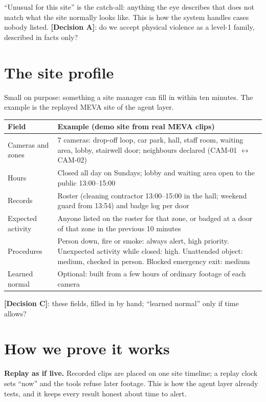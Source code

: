\documentclass[11pt,a4paper]{article}
\newcommand{\decision}[1]{\textbf{\color{accent}[Decision #1]}}
\begin{document}
``Unusual for this site'' is the catch-all: anything the eye describes that does not match what the site normally
looks like. This is how the system handles cases nobody listed.
\decision{A}: do we accept physical violence as a level-1 family, described in facts only?

\section{The site profile}
Small on purpose: something a site manager can fill in within ten minutes. The example is the replayed MEVA site
of the agent layer.

\begin{center}
\small
\begin{tabularx}{\textwidth}{L{3.3cm}Y}
\toprule
\textbf{Field} & \textbf{Example (demo site from real MEVA clips)}\\
\midrule
Cameras and zones & 7 cameras: drop-off loop, car park, hall, staff room, waiting area, lobby, stairwell door; neighbours declared (CAM-01 $\leftrightarrow$ CAM-02)\\
Hours & Closed all day on Sundays; lobby and waiting area open to the public 13:00--15:00\\
Records & Roster (cleaning contractor 13:00--15:00 in the hall; weekend guard from 13:54) and badge log per door\\
Expected activity & Anyone listed on the roster for that zone, or badged at a door of that zone in the previous 10 minutes\\
Procedures & Person down, fire or smoke: always alert, high priority. Unexpected activity while closed: high. Unattended object: medium, checked in person. Blocked emergency exit: medium\\
Learned normal & Optional: built from a few hours of ordinary footage of each camera\\
\bottomrule
\end{tabularx}
\end{center}
\decision{C}: these fields, filled in by hand; ``learned normal'' only if time allows?

\section{How we prove it works}
\textbf{Replay as if live.} Recorded clips are placed on one site timeline; a replay clock sets ``now'' and the
tools refuse later footage. This is how the agent layer already tests, and it keeps every result honest about time
to alert.
\end{document}
